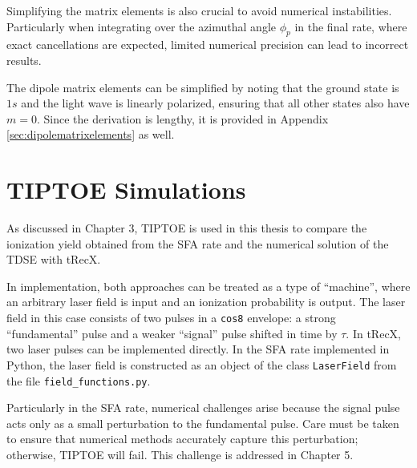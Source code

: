 Simplifying the matrix elements is also crucial to avoid numerical instabilities. 
Particularly when integrating over the azimuthal angle $\phi_p$ in the final rate, where exact cancellations are expected, limited numerical precision can lead to incorrect results.

The dipole matrix elements can be simplified by noting that the ground state is $1s$ and the light wave is linearly polarized, ensuring that all other states also have $m=0$. Since the derivation is lengthy, it is provided in Appendix \ref{sec:dipolematrixelements} as well.

\section{TIPTOE Simulations}
As discussed in Chapter 3, TIPTOE is used in this thesis to compare the ionization yield obtained from the SFA rate and the numerical solution of the TDSE with tRecX.

In implementation, both approaches can be treated as a type of ``machine'', where an arbitrary laser field is input and an ionization probability is output. The laser field in this case consists of two pulses in a \texttt{cos8} envelope: a strong ``fundamental'' pulse and a weaker ``signal'' pulse shifted in time by $\tau$. 
In tRecX, two laser pulses can be implemented directly. In the SFA rate implemented in Python, the laser field is constructed as an object of the class \texttt{LaserField} from the file \texttt{field\_functions.py}.

Particularly in the SFA rate, numerical challenges arise because the signal pulse acts only as a small perturbation to the fundamental pulse. Care must be taken to ensure that numerical methods accurately capture this perturbation; otherwise, TIPTOE will fail. This challenge is addressed in Chapter 5.